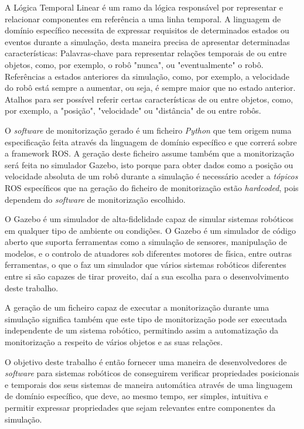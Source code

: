 A Lógica Temporal Linear é um ramo da lógica responsável por representar e relacionar componentes em referência a uma linha temporal. A linguagem de domínio específico necessita de expressar requisitos de determinados estados ou eventos durante a simulação, desta maneira precisa de apresentar determinadas características: Palavras-chave para representar relações temporais de ou entre objetos, como, por exemplo, o robô "nunca", ou "eventualmente" o robô. Referências a estados anteriores da simulação, como, por exemplo, a velocidade do robô está sempre a aumentar, ou seja, é sempre maior que no estado anterior. Atalhos para ser possível referir certas características de ou entre objetos, como, por exemplo, a "posição", "velocidade" ou "distância" de ou entre robôs.

O \textit{software} de monitorização gerado é um ficheiro \textit{Python} que tem origem numa especificação feita através da linguagem de domínio específico e que correrá sobre a framework ROS. A geração deste ficheiro assume também que a monitorização será feita no simulador Gazebo, isto porque para obter dados como a posição ou velocidade absoluta de um robô durante a simulação é necessário aceder a \textit{tópicos} ROS específicos que na geração do ficheiro de monitorização estão \textit{hardcoded}, pois dependem do \textit{software} de monitorização escolhido. 

O Gazebo é um simulador de alta-fidelidade capaz de simular sistemas robóticos em qualquer tipo de ambiente ou condições. O Gazebo é um simulador de código aberto que suporta ferramentas como a simulação de sensores, manipulação de modelos, e o controlo de atuadores sob diferentes motores de física, entre outras ferramentas, o que o faz um simulador que vários sistemas robóticos diferentes entre si são capazes de tirar proveito, daí a sua escolha para o desenvolvimento deste trabalho.

A geração de um ficheiro capaz de executar a monitorização durante uma simulação significa também que este tipo de monitorização pode ser executada independente de um sistema robótico, permitindo assim a automatização da monitorização a respeito de vários objetos e as suas relações.

O objetivo deste trabalho é então fornecer uma maneira de desenvolvedores de \textit{software} para sistemas robóticos de conseguirem verificar propriedades posicionais e temporais dos seus sistemas de maneira automática através de uma linguagem de domínio específico, que deve, ao mesmo tempo, ser simples, intuitiva e permitir expressar propriedades que sejam relevantes entre componentes da simulação.

